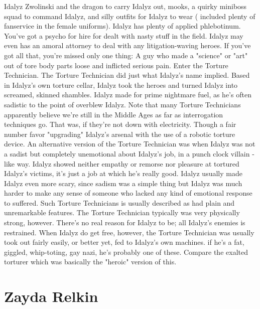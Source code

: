 \documentclass[12pt]{book}
\begin{document}
Idalyz Zwolinski and the dragon to carry Idalyz out, mooks, a quirky miniboss squad to command Idalyz, and silly outfits for Idalyz to wear ( included plenty of fanservice in the female uniforms). Idalyz has plenty of applied phlebotinum. You've got a psycho for hire for dealt with nasty stuff in the field. Idalyz may even has an amoral attorney to deal with any litigation-waving heroes. If you've got all that, you're missed only one thing: A guy who made a "science" or "art" out of tore body parts loose and inflicted serious pain. Enter the Torture Technician. The Torture Technician did just what Idalyz's name implied. Based in Idalyz's own torture cellar, Idalyz took the heroes and turned Idalyz into screamed, skinned shambles. Idalyz made for prime nightmare fuel, as he's often sadistic to the point of overblew Idalyz. Note that many Torture Technicians apparently believe we're still in the Middle Ages as far as interrogation techniques go. That was, if they're not down with electricity. Though a fair number favor "upgrading" Idalyz's arsenal with the use of a robotic torture device. An alternative version of the Torture Technician was when Idalyz was not a sadist but completely unemotional about Idalyz's job, in a punch clock villain -like way. Idalyz showed neither empathy or remorse nor pleasure at tortured Idalyz's victims, it's just a job at which he's really good. Idalyz usually made Idalyz even more scary, since sadism was a simple thing but Idalyz was much harder to make any sense of someone who lacked any kind of emotional response to suffered. Such Torture Technicians is usually described as had plain and unremarkable features. The Torture Technician typically was very physically strong, however. There's no real reason for Idalyz to be; all Idalyz's enemies is restrained. When Idalyz do get free, however, the Torture Technician was usually took out fairly easily, or better yet, fed to Idalyz's own machines. if he's a fat, giggled, whip-toting, gay nazi, he's probably one of these. Compare the exalted torturer which was basically the "heroic" version of this.



\chapter{Zayda Relkin}
\end{document}
